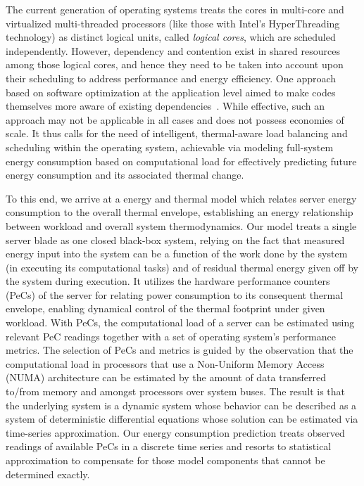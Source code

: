The current generation of operating systems treats the cores in
multi-core and virtualized multi-threaded processors (like those with
Intel's HyperThreading technology) as distinct logical units, called
\textit{logical cores}, which are scheduled independently.  However,
dependency and contention exist in shared resources among those logical
cores, and hence they need to be taken into account upon their
scheduling to address performance and energy efficiency.  One approach
based on software optimization at the application level aimed to make
codes themselves more aware of existing dependencies~\cite{Khan2011}.
While effective, such an approach may not be applicable in all cases and
does not possess economies of scale.  It thus calls for the need of
intelligent, thermal-aware load balancing and scheduling within the
operating system, achievable via modeling full-system energy consumption
based on computational load for effectively predicting future energy
consumption and its associated thermal change.

To this end, we arrive at a energy and thermal model which relates server energy
consumption to the overall thermal envelope, establishing an energy
relationship between workload and overall system thermodynamics.
Our model treats a single server blade as one closed black-box system,
relying on the fact that measured energy input into the system can be a
function of the work done by the system (in executing its computational
tasks) and of residual thermal energy given off by the system during
execution.  It utilizes the hardware performance counters (PeCs) of the
server for relating power consumption to its consequent thermal
envelope, enabling dynamical control of the thermal footprint under
given workload.  With PeCs, the computational load of a server can be
estimated using relevant PeC readings together with a set of operating
system's performance metrics. The selection of PeCs and metrics is
guided by the observation that the computational load in processors that
use a Non-Uniform Memory Access (NUMA) architecture can be estimated by
the amount of data transferred to/from memory and amongst processors
over system buses. The result is that the underlying system is a dynamic
system whose behavior can be described as a system of deterministic
differential equations whose solution can be estimated via time-series
approximation. Our energy consumption prediction treats observed
readings of available PeCs in a discrete time series and resorts to
statistical approximation to compensate for those model components that
cannot be determined exactly.

